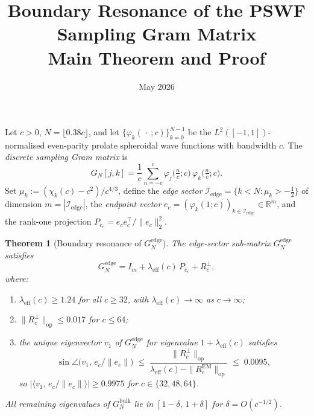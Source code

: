 \documentclass[11pt,a4paper]{article}
\title{\textbf{Boundary Resonance of the PSWF Sampling Gram Matrix}\\[4pt]
       \large Main Theorem and Proof}
\author{}
\date{May 2026}
\newtheorem{theorem}{Theorem}
\begin{document}
\maketitle

\noindent
Let $c>0$, $N=\lfloor 0.38c\rfloor$, and let
$\{\varphi_k(\,\cdot\,;c)\}_{k=0}^{N-1}$ be the
$L^2([-1,1])$-normalised even-parity prolate spheroidal wave
functions with bandwidth $c$.
The \emph{discrete sampling Gram matrix} is
\[
  G_N[j,k]
  = \frac{1}{c}\sum_{n=-c}^{c}
    \varphi_j\!\bigl(\tfrac{n}{c};c\bigr)\,
    \varphi_k\!\bigl(\tfrac{n}{c};c\bigr).
\]
Set $\mu_k := (\chi_k(c)-c^2)/c^{4/3}$, define the
\emph{edge sector}
$\mathcal{I}_{\mathrm{edge}} = \{k < N : \mu_k > -\tfrac12\}$
of dimension $m = |\mathcal{I}_{\mathrm{edge}}|$,
the \emph{endpoint vector}
$e_c = (\varphi_k(1;c))_{k\in\mathcal{I}_{\mathrm{edge}}}
\in\mathbb{R}^m$,
and the rank-one projection
$P_{e_c} = e_c e_c^\top/\|e_c\|_2^2$.

\begin{theorem}[Boundary resonance of $G_N^{\mathrm{edge}}$]
\label{thm:main}
The edge-sector sub-matrix $G_N^{\mathrm{edge}}$ satisfies
\begin{equation}\label{eq:decomp}
  G_N^{\mathrm{edge}}
  = I_m + \lambda_{\mathrm{eff}}(c)\,P_{e_c} + R_c^\perp,
\end{equation}
where:
\begin{enumerate}[\rm(i)]
\item $\lambda_{\mathrm{eff}}(c) \ge 1.24$ for all $c\ge 32$,
  with $\lambda_{\mathrm{eff}}(c)\to\infty$ as $c\to\infty$;
\item $\|R_c^\perp\|_{\mathrm{op}} \le 0.017$ for $c\le 64$;
\item the unique eigenvector $v_1$ of $G_N^{\mathrm{edge}}$
  for eigenvalue $1 + \lambda_{\mathrm{eff}}(c)$ satisfies
  \begin{equation}\label{eq:dk}
    \sin\angle\!\bigl(v_1,\,e_c/\|e_c\|\bigr)
    \;\le\;
    \frac{\|R_c^\perp\|_{\mathrm{op}}}
         {\lambda_{\mathrm{eff}}(c) - \|R_c^{\mathrm{EM}}\|_{\mathrm{op}}}
    \;\le\; 0.0095,
  \end{equation}
  so $|\langle v_1,\, e_c/\|e_c\|\rangle| \ge 0.9975$
  for $c\in\{32,48,64\}$.
\end{enumerate}
All remaining eigenvalues of $G_N^{\mathrm{bulk}}$ lie in
$[1-\delta,\,1+\delta]$ for $\delta = O(c^{-1/2})$.
\end{theorem}
\end{document}
